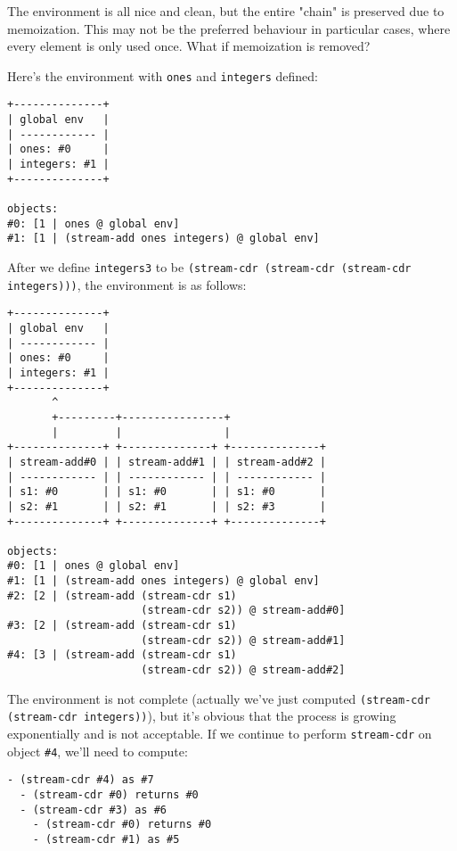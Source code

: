 \documentclass[../main.tex]{subfiles}
\begin{document}
The environment is all nice and clean, but the entire "chain" is preserved due to memoization. This may not be the preferred behaviour in particular cases, where every element is only used once. What if memoization is removed?

Here's the environment with \lstinline{ones} and \lstinline{integers} defined:

\begin{lstlisting}
+--------------+
| global env   |
| ------------ |
| ones: #0     |
| integers: #1 |
+--------------+

objects:
#0: [1 | ones @ global env]
#1: [1 | (stream-add ones integers) @ global env]
\end{lstlisting}

After we define \lstinline{integers3} to be \lstinline{(stream-cdr (stream-cdr (stream-cdr integers)))}, the environment is as follows:

\begin{lstlisting}
+--------------+
| global env   |
| ------------ |
| ones: #0     |
| integers: #1 |
+--------------+
       ^
       +---------+----------------+
       |         |                |
+--------------+ +--------------+ +--------------+ 
| stream-add#0 | | stream-add#1 | | stream-add#2 |
| ------------ | | ------------ | | ------------ |
| s1: #0       | | s1: #0       | | s1: #0       |
| s2: #1       | | s2: #1       | | s2: #3       |
+--------------+ +--------------+ +--------------+

objects:
#0: [1 | ones @ global env]
#1: [1 | (stream-add ones integers) @ global env]
#2: [2 | (stream-add (stream-cdr s1)
                     (stream-cdr s2)) @ stream-add#0]
#3: [2 | (stream-add (stream-cdr s1)
                     (stream-cdr s2)) @ stream-add#1]
#4: [3 | (stream-add (stream-cdr s1)
                     (stream-cdr s2)) @ stream-add#2]
\end{lstlisting}

The environment is not complete (actually we've just computed \lstinline{(stream-cdr (stream-cdr integers))}), but it's obvious that the process is growing exponentially and is not acceptable. If we continue to perform \lstinline{stream-cdr} on object \lstinline{#4}, we'll need to compute:

\begin{lstlisting}
- (stream-cdr #4) as #7
  - (stream-cdr #0) returns #0
  - (stream-cdr #3) as #6
    - (stream-cdr #0) returns #0
    - (stream-cdr #1) as #5
\end{lstlisting}
\end{document}
